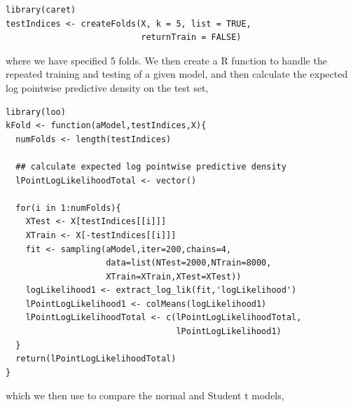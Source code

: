 \documentclass[11pt,fullpage]{book}
\begin{document}
\begin{verbatim}
library(caret)
testIndices <- createFolds(X, k = 5, list = TRUE, 
                           returnTrain = FALSE)
\end{verbatim}

where we have specified 5 folds. We then create a R function to handle the repeated training and testing of a given model, and then calculate the expected log pointwise predictive density on the test set,

\begin{verbatim}
library(loo)
kFold <- function(aModel,testIndices,X){
  numFolds <- length(testIndices)
  
  ## calculate expected log pointwise predictive density 
  lPointLogLikelihoodTotal <- vector()
  
  for(i in 1:numFolds){
    XTest <- X[testIndices[[i]]]
    XTrain <- X[-testIndices[[i]]]
    fit <- sampling(aModel,iter=200,chains=4,
                    data=list(NTest=2000,NTrain=8000,
                    XTrain=XTrain,XTest=XTest))
    logLikelihood1 <- extract_log_lik(fit,'logLikelihood')
    lPointLogLikelihood1 <- colMeans(logLikelihood1)
    lPointLogLikelihoodTotal <- c(lPointLogLikelihoodTotal,
                                  lPointLogLikelihood1)
  }
  return(lPointLogLikelihoodTotal)
}
\end{verbatim}

which we then use to compare the normal and Student t models,
\end{document}
